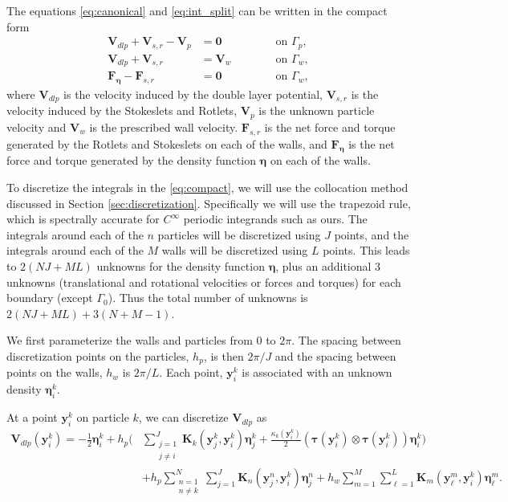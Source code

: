 The equations \ref{eq:canonical} and \eqref{eq:int_split} can be written in the compact form
 \begin{subequations}\label{eq:compact}
\begin{alignat}{3}
	\mathbf{V}_{dlp} + \mathbf{V}_{s,r} - \mathbf{V}_{p} &= \mathbf{0} \qquad &&\text{ on } \Gamma_p,\\
	\mathbf{V}_{dlp} + \mathbf{V}_{s,r} &= \mathbf{V}_{w} \qquad &&\text{ on } \Gamma_w,\\
	\mathbf{F}_{\pmb{\eta}} - \mathbf{F}_{s,r} &= \mathbf{0} \qquad &&\text{ on } \Gamma_w,
\end{alignat}
\end{subequations}
where $\mathbf{V}_{dlp}$ is the velocity induced by the double layer potential, $\mathbf{V}_{s,r}$ is the velocity induced by the Stokeslets and Rotlets, $\mathbf{V}_p$ is the unknown particle velocity and $\mathbf{V}_w$ is the prescribed wall velocity. $\mathbf{F}_{s,r}$ is the net force and torque generated by the Rotlets and Stokeslets on each of the walls, and $\mathbf{F}_{\pmb{\eta}}$ is the net force and torque generated by the density function $\pmb{\eta}$ on each of the walls. 

To discretize the integrals in the \eqref{eq:compact}, we will use the collocation method discussed in Section \ref{sec:discretization}. Specifically we will use the trapezoid rule, which is spectrally accurate for $C^\infty$ periodic integrands such as ours. The integrals around each of the $n$ particles will be discretized using $J$ points, and the integrals around each of the $M$ walls will be discretized using $L$ points. This leads to $2(NJ + ML)$ unknowns for the density function $\pmb{\eta}$, plus an additional $3$ unknowns (translational and rotational velocities or forces and torques) for each boundary (except $\Gamma_0$). Thus the total number of unknowns is $2(NJ + ML) + 3(N+M - 1)$. 

We first parameterize the walls and particles from $0$ to $2\pi$. The spacing between discretization points on the particles, $h_{p}$, is then $2\pi/J$ and the spacing between points on the walls, $h_w$ is $2\pi/L$. Each point, $\mathbf{y}^k_i$ is associated with an unknown density $\pmb{\eta}^k_i$.

At a point $\mathbf{y}^k_i$ on particle $k$, we can discretize $\mathbf{V}_{dlp}$ as
\begin{equation}\label{eq:vdlp}
\begin{aligned}
\mathbf{V}_{dlp}(\mathbf{y}^k_i) = -\frac{1}{2}\pmb{\eta}^k_i  +h_p\bigg( &\sum_{\substack{j=1\\j\ne i}}^J \mathbf{K}_k(\mathbf{y}^k_j,\mathbf{y}^k_i)\pmb{\eta}_j^k +\frac{\kappa_k(\mathbf{y}^k_i)}{2}(\pmb{\tau}(\mathbf{y}^k_i)\otimes\pmb{\tau}(\mathbf{y}_i^k))\pmb{\eta}_i^k\bigg) \\&+ h_p\sum\limits_{\substack{n=1\\n\ne k}}^N\sum\limits_{j=1}^J  \mathbf{K}_n(\mathbf{y}^n_j,\mathbf{y}^k_i)\pmb{\eta}_j^n  + h_w \sum\limits_{m=1}^M\sum\limits_{\ell=1}^L \mathbf{K}_m(\mathbf{y}^m_\ell,\mathbf{y}^k_i)\pmb{\eta}^m_\ell .
\end{aligned}
\end{equation}
 
